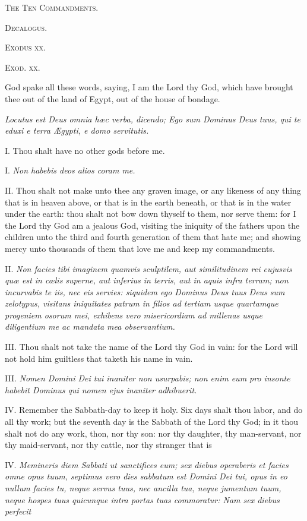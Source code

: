 T\textsc{he} T\textsc{en} C\textsc{ommandments}.

D\textsc{ecalogus}.

E\textsc{xodus xx}.

E\textsc{xod. xx}.

God spake all these words, saying, I am the Lord thy God, which have brought thee out of the land of Egypt, out of the house of bondage.

\emph{Locutus est Deus omnia hæc verba, dicendo; Ego sum Dominus Deus tuus, qui te eduxi e terra Ægypti, e domo servitutis.}

I. Thou shalt have no other gods before me.

I. \emph{Non habebis deos alios coram me.}

II. Thou shalt not make unto thee any graven image, or any likeness of any thing that is in heaven above, or that is in the earth beneath, or that is in the water under the earth: thou shalt not bow down thyself to them, nor serve them: for I the Lord thy God am a jealous God, visiting the iniquity of the fathers upon the children unto the third and fourth generation of them that hate me; and showing mercy unto thousands of them that love me and keep my commandments.

II. \emph{Non facies tibi imaginem quamvis sculptilem, aut similitudinem rei cujusvis quæ est in cœlis superne, aut inferius in terris, aut in aquis infra terram; non incurvabis te iis, nec eis servies: siquidem ego Dominus Deus tuus Deus sum zelotypus, visitans iniquitates patrum in filios ad tertiam usque quartamque progeniem osorum mei, exhibens vero misericordiam ad millenas usque diligentium me ac mandata mea observantium.}

III. Thou shalt not take the name of the Lord thy God in vain: for the Lord will not hold him guiltless that taketh his name in vain.

III. \emph{Nomen Domini Dei tui inaniter non usurpabis; non enim eum pro insonte habebit Dominus qui nomen ejus inaniter adhibuerit.}

IV. Remember the Sabbath-day to keep it holy. Six days shalt thou labor, and do all thy work; but the seventh day is the Sabbath of the Lord thy God; in it thou shalt not do any work, thon, nor thy son: nor thy daughter, thy man-servant, nor thy maid-servant, nor thy cattle, nor thy stranger that is

IV. \emph{Memineris diem Sabbati ut sanctifices eum; sex diebus operaberis et facies omne opus tuum, septimus vero dies sabbatum est Domini Dei tui, opus in eo nullum facies tu, neque servus tuus, nec ancilla tua, neque jumentum tuum, neque hospes tuus quicunque intra portas tuas commoratur: Nam sex diebus perfecit }

